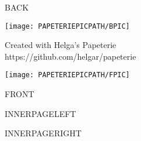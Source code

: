 \documentclass[a5paper,landscape]{scrartcl}
\begin{document}
\begin{multicols}{2}

\begin{center}

\vspace*{\fill}

BACK

\vspace{1cm}

\centering\texttt{[image: PAPETERIEPICPATH/BPIC]}

\vspace{2cm}

{\color{grey}\tiny{} Created with Helga's Papeterie\\ https://github.com/helgar/papeterie \par }

\end{center}

\columnbreak

  \begin{center}
    \centering\texttt{[image: PAPETERIEPICPATH/FPIC]}

    \vspace{1cm}

    {\huge\calligra FRONT}
  \end{center}

\end{multicols}

\pagebreak

\begin{multicols}{2}

\begin{center}
  {\color{grey}INNERPAGELEFT}
\end{center}

\columnbreak

INNERPAGERIGHT

\end{multicols}
\end{document}
